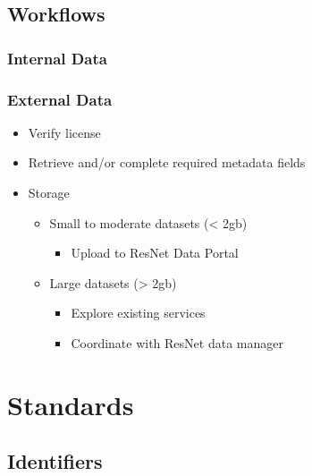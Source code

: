 \documentclass[
]{book}
\providecommand{\tightlist}{%
  \setlength{\itemsep}{0pt}\setlength{\parskip}{0pt}}
\begin{document}
\hypertarget{workflows}{%
\section{Workflows}\label{workflows}}

\hypertarget{internal-data}{%
\subsection{Internal Data}\label{internal-data}}

\hypertarget{external-data}{%
\subsection{External Data}\label{external-data}}

\begin{itemize}
\tightlist
\item
  Verify license
\item
  Retrieve and/or complete required metadata fields
\item
  Storage

  \begin{itemize}
  \tightlist
  \item
    Small to moderate datasets (\textless{} 2gb)

    \begin{itemize}
    \tightlist
    \item
      Upload to ResNet Data Portal
    \end{itemize}
  \item
    Large datasets (\textgreater{} 2gb)

    \begin{itemize}
    \tightlist
    \item
      Explore existing services
    \item
      Coordinate with ResNet data manager
    \end{itemize}
  \end{itemize}
\end{itemize}

\hypertarget{standards}{%
\chapter{Standards}\label{standards}}

\hypertarget{identifiers}{%
\section{Identifiers}\label{identifiers}}
\end{document}
